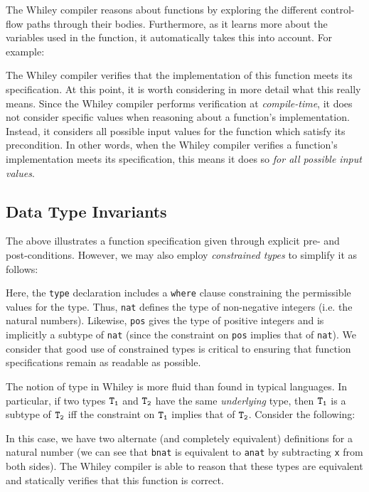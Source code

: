 The Whiley compiler reasons about functions by exploring the different
control-flow paths through their bodies.  Furthermore, as it learns
more about the variables used in the function, it automatically takes
this into account.  For example:



The Whiley compiler verifies that the implementation of this function
meets its specification.  At this point, it is worth considering in
more detail what this really means.  Since the Whiley compiler
performs verification at {\em compile-time}, it does not consider
specific values when reasoning about a function's implementation.
Instead, it considers all possible input values for the function which
satisfy its precondition.  In other words, when the Whiley compiler
verifies a function's implementation meets its specification, this
means it does so {\em for all possible input values}.  

\subsection{Data Type Invariants}

The above illustrates a function specification given through explicit pre- and
post-conditions.  However, we may also employ {\em constrained types}
to simplify it as follows:



Here, the \lstinline{type} declaration includes a \lstinline{where}
clause constraining the permissible values for the type.  Thus,
\lstinline{nat} defines the type of non-negative integers (i.e. the
natural numbers).  Likewise, \lstinline{pos} gives the type of
positive integers and is implicitly a subtype of \lstinline{nat}
(since the constraint on \lstinline{pos} implies that of
\lstinline{nat}).  We consider that good use of constrained types is
critical to ensuring that function specifications remain as readable
as possible.

The notion of type in Whiley is more fluid than found in typical
languages.  In particular, if two types ${\tt T_1}$ and ${\tt T_2}$
have the same {\em underlying} type, then ${\tt T_1}$ is a subtype of
${\tt T_2}$ iff the constraint on ${\tt T_1}$ implies that of ${\tt
  T_2}$.  Consider the following:



In this case, we have two alternate (and completely equivalent)
definitions for a natural number (we can see that \lstinline{bnat} is
equivalent to \lstinline{anat} by subtracting \lstinline{x} from both sides).
The Whiley compiler is able to reason that these types are equivalent
and statically verifies that this function is correct.

